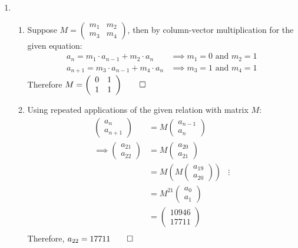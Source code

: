 \documentclass[12pt, a4paper]{article}
\begin{document}
\begin{enumerate}[Q\arabic*.]
  \pagebreak

\item 
  \begin{enumerate}[(\alph*)]
    \item Suppose $M = \left(\begin{array}{cc} m_1   & m_2\\ m_3 & m_4 \end{array}\right)$, then by column-vector multiplication for the given equation:
      \begin{align*}
        a_n = m_1\cdot a_{n-1} + m_2\cdot a_{n} &\implies m_1 = 0 \text{ and } m_2 = 1\\
        a_{n+1} = m_3\cdot a_{n-1} + m_4\cdot a_{n} &\implies m_3 = 1 \text{ and } m_4 = 1\tag*{(Given recurrence relation)}
      \end{align*}
      Therefore $M = \left(\begin{array}{cc} 0 & 1\\ 1 & 1 \end{array}\right) \qed$

    \item Using repeated applications of the given relation with matrix $M$:
      \begin{align*}
        \left(\begin{array}{c} a_{n}\\ a_{n+1} \end{array}\right) &= M\left(\begin{array}{c} a_{n-1}\\ a_{n} \end{array}\right)\\ 
        \implies \left(\begin{array}{c} a_{21}\\ a_{22} \end{array}\right) &= M\left(\begin{array}{c} a_{20}\\ a_{21} \end{array}\right)\\ 
         &= M\left( M\left(\begin{array}{c} a_{19}\\ a_{20} \end{array}\right)\right) 
         &\vdots\\
         &= M^{21}\left(\begin{array}{c} a_{0}\\ a_{1} \end{array}\right)\\
         &= \left(\begin{array}{c} 10946\\ 17711 \end{array}\right)\\
      \end{align*}
      Therefore, $a_{22} = 17711 \qed$


\end{enumerate}
\end{enumerate}
\end{document}
